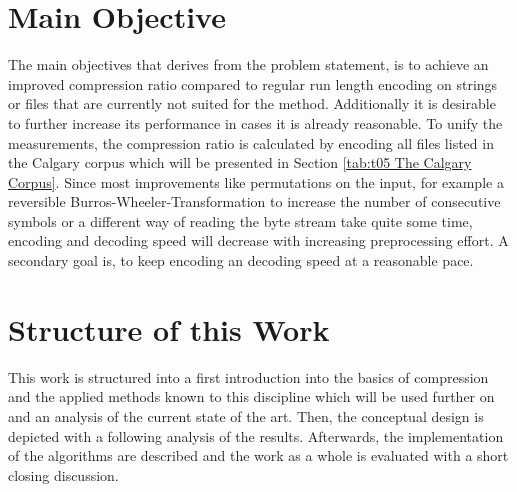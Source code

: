 \section{Main Objective}
\label{ch:Introduction:sec:Main Objective}
\par{
The main objectives that derives from the problem statement, is to achieve an improved compression ratio compared to regular run length encoding on strings or files that are currently not suited for the method. Additionally it is desirable to further increase its performance in cases it is already reasonable. To unify the measurements, the compression ratio is calculated by encoding all files listed in the Calgary corpus which will be presented in Section \ref{tab:t05 The Calgary Corpus}. Since most improvements like permutations on the input, for example a reversible Burros-Wheeler-Transformation to increase the number of consecutive symbols or a different way of reading the byte stream take quite some time, encoding and decoding speed will decrease with increasing preprocessing effort. A secondary goal is, to keep encoding an decoding speed at a reasonable pace.
}
\section{Structure of this Work}
\label{ch:Intoduction:sec:Structure}
\par{
This work is structured into a first introduction into the basics of compression and the applied methods known to this discipline which will be used further on and an analysis of the current state of the art. Then, the conceptual design is depicted with a following analysis of the results. Afterwards, the implementation of the algorithms are described and the work as a whole is evaluated with a short closing discussion.  
}
